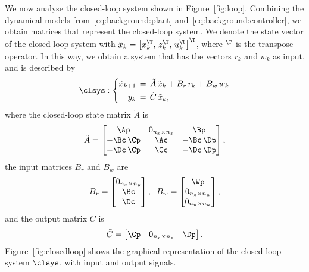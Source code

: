 We now analyse the closed-loop system shown in Figure~\ref{fig:loop}.
Combining the dynamical models from~\eqref{eq:background:plant} and~\eqref{eq:background:controller}, we obtain matrices that represent the closed-loop system.
We denote the state vector of the closed-loop system with $\tilde{x}_k = \left[ x_k^\T,\, z_k^\T,\, u_k^\T \right]^\T$, where $^\T$ is the transpose operator.
In this way, we obtain a system that has the vectors $r_k$ and $w_k$ as input, and is described by
%
\begin{equation} 
\label{eq:feedback-basic}
    \clsys : \left\{
    \begin{aligned}
        \tilde{x}_{k+1} &\,=\, \tilde A\,\tilde{x}_{k} + B_r\,r_{k} + B_w\,w_{k}\\
        y_{k} &\,=\, \tilde C\,\tilde{x}_{k},
    \end{aligned} \right.
\end{equation}
%
where the closed-loop state matrix $\tilde A$ is 
%
\begin{equation}
\label{eq:matrixA}
    \tilde A =
    \begin{bmatrix} \Ap       & 0_{n_x \times n_z} & \Bp \\
                    -\Bc\,\Cp & \Ac                                      & -\Bc\,\Dp \\
                    -\Dc\,\Cp & \Cc                                      & -\Dc\,\Dp
    \end{bmatrix},
\end{equation}
%
the input matrices $B_r$ and $B_w$ are
%
\begin{equation}
    B_r = \begin{bmatrix} 0_{n_x \times n_y} \\ \Bc \\ \Dc \end{bmatrix},\;\;
    B_w = \begin{bmatrix} \Wp \\ 0_{n_z \times n_u} \\ 0_{n_u \times n_u} \end{bmatrix},
\end{equation}
%
and the output matrix $\tilde C$ is
%
\begin{equation}
    \tilde C = \begin{bmatrix} \Cp & 0_{n_x \times n_z} & \Dp \end{bmatrix}.
\end{equation}
%
Figure~\ref{fig:closedloop} shows the graphical representation of the closed-loop system $\clsys$, with input and output signals.

